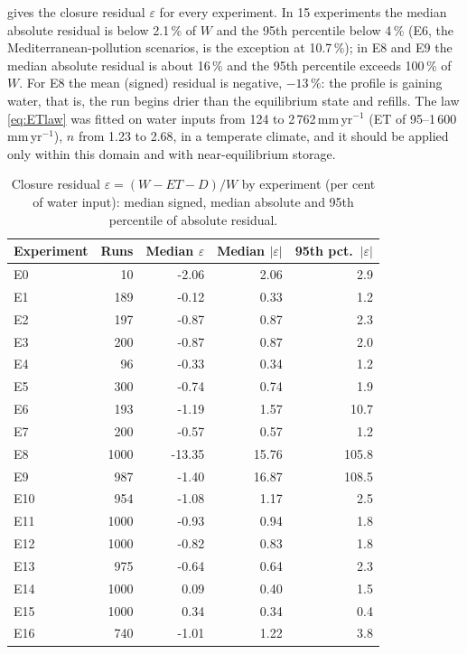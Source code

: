 \documentclass[preprint,12pt,authoryear]{elsarticle}
\begin{document}
 gives the closure residual $\varepsilon$ for every experiment. In 15 experiments the median absolute residual is below 2.1\,\% of $W$ and the 95th percentile below 4\,\% (E6, the Mediterranean-pollution scenarios, is the exception at 10.7\,\%); in E8 and E9 the median absolute residual is about 16\,\% and the 95th percentile exceeds 100\,\% of $W$. For E8 the mean (signed) residual is negative, $-13\,\%$: the profile is gaining water, that is, the run begins drier than the equilibrium state and refills. The law \cref{eq:ETlaw} was fitted on water inputs from 124 to 2\,762\,mm\,yr$^{-1}$ (ET of 95--1\,600\,mm\,yr$^{-1}$), $n$ from 1.23 to 2.68, in a temperate climate, and it should be applied only within this domain and with near-equilibrium storage.

\begin{table}[H]\centering\small
\caption{Closure residual $\varepsilon=(W-\mathit{ET}-D)/W$ by experiment (per cent of water input): median signed, median absolute and 95th percentile of absolute residual.}
\label{tab:closure2}
\begin{tabular}{lrrrr}
\toprule
Experiment & Runs & Median $\varepsilon$ & Median $|\varepsilon|$ & 95th pct.\ $|\varepsilon|$\\\midrule
E0 & 10 & -2.06 & 2.06 & 2.9\\
E1 & 189 & -0.12 & 0.33 & 1.2\\
E2 & 197 & -0.87 & 0.87 & 2.3\\
E3 & 200 & -0.87 & 0.87 & 2.0\\
E4 & 96 & -0.33 & 0.34 & 1.2\\
E5 & 300 & -0.74 & 0.74 & 1.9\\
E6 & 193 & -1.19 & 1.57 & 10.7\\
E7 & 200 & -0.57 & 0.57 & 1.2\\
E8 & 1000 & -13.35 & 15.76 & 105.8\\
E9 & 987 & -1.40 & 16.87 & 108.5\\
E10 & 954 & -1.08 & 1.17 & 2.5\\
E11 & 1000 & -0.93 & 0.94 & 1.8\\
E12 & 1000 & -0.82 & 0.83 & 1.8\\
E13 & 975 & -0.64 & 0.64 & 2.3\\
E14 & 1000 & 0.09 & 0.40 & 1.5\\
E15 & 1000 & 0.34 & 0.34 & 0.4\\
E16 & 740 & -1.01 & 1.22 & 3.8\\
\bottomrule
\end{tabular}
\end{table}
\end{document}
